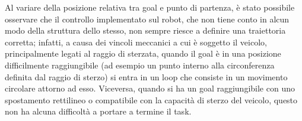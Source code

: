 Al variare della posizione relativa tra goal e punto di partenza, è stato possibile osservare che il controllo implementato sul robot, che non tiene conto in alcun modo della struttura dello stesso, non sempre riesce a definire una traiettoria corretta; infatti, a causa dei vincoli meccanici a cui è soggetto il veicolo, principalmente legati al raggio di sterzata, quando il goal è in una posizione difficilmente raggiungibile (ad esempio un punto interno alla circonferenza definita dal raggio di sterzo) si entra in un loop che consiste in un movimento circolare attorno ad esso. Viceversa, quando si ha un goal raggiungibile con uno spostamento rettilineo o compatibile con la capacità di sterzo del veicolo, questo non ha alcuna difficoltà a portare a termine il task.